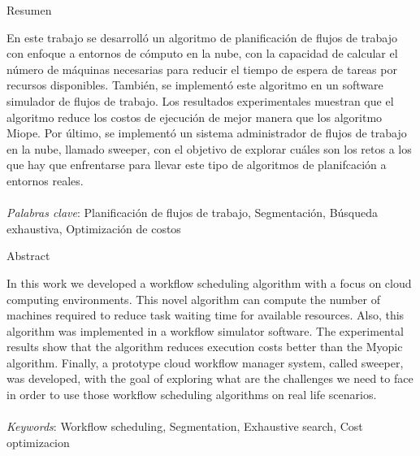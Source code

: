 \begin{center}
Resumen
\end{center}
\noindent En este trabajo se desarroll\'o un algoritmo de planificaci\'on de flujos de trabajo con enfoque a entornos de c\'omputo en la nube, con la capacidad de calcular el número de máquinas necesarias para reducir el tiempo de espera de tareas por recursos disponibles. Tambi\'en, se implement\'o este algoritmo en un software simulador de flujos de trabajo. Los resultados experimentales muestran que el algoritmo reduce los costos de ejecuci\'on de mejor manera que los algoritmo Miope. Por \'ultimo, se implement\'o un sistema administrador de flujos de trabajo en la nube, llamado sweeper, con el objetivo de explorar cu\'ales son los retos a los que hay que enfrentarse para llevar este tipo de algoritmos de planifcaci\'on a entornos reales.
\\\\
\noindent \emph{Palabras clave}: Planificación de flujos de trabajo, Segmentación, Búsqueda exhaustiva, Optimizaci\'on de costos

\begin{center}
Abstract
\end{center}
\noindent In this work we developed a workflow scheduling algorithm with a focus on cloud computing environments. This novel algorithm can compute the number of machines required to reduce task waiting time for available resources. Also, this algorithm was implemented in a workflow simulator software. The experimental results show that the algorithm reduces execution costs better than the Myopic algorithm. Finally, a prototype cloud workflow manager system, called sweeper, was developed, with the goal of exploring what are the challenges we need to face in order to use those workflow scheduling algorithms on real life scenarios.
\\\\
\noindent \emph{Keywords}: Workflow scheduling, Segmentation, Exhaustive search, Cost optimizacion

\clearpage